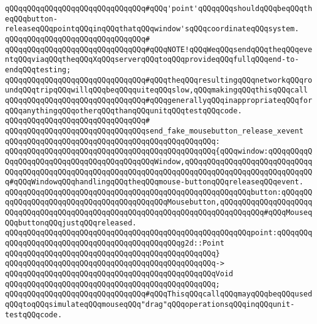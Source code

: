 \verb|qQQqqQQqqQQqqQQqqQQqqQQqqQQqqQQq#qQQq'point'qQQqqQQqshouldqQQqbeqQQqtheqQQqbutton-releaseqQQqpointqQQqinqQQqthatqQQqwindow'sqQQqcoordinateqQQqsystem.|\newline
\verb|qQQqqQQqqQQqqQQqqQQqqQQqqQQqqQQq#|\newline
\verb|qQQqqQQqqQQqqQQqqQQqqQQqqQQqqQQq#qQQqNOTE!qQQqWeqQQqsendqQQqtheqQQqeventqQQqviaqQQqtheqQQqXqQQqserverqQQqtoqQQqprovideqQQqfullqQQqend-to-endqQQqtesting;|\newline
\verb|qQQqqQQqqQQqqQQqqQQqqQQqqQQqqQQq#qQQqtheqQQqresultingqQQqnetworkqQQqroundqQQqtripqQQqwillqQQqbeqQQqquiteqQQqslow,qQQqmakingqQQqthisqQQqcall|\newline
\verb|qQQqqQQqqQQqqQQqqQQqqQQqqQQqqQQq#qQQqgenerallyqQQqinappropriateqQQqforqQQqanythingqQQqotherqQQqthanqQQqunitqQQqtestqQQqcode.|\newline
\verb|qQQqqQQqqQQqqQQqqQQqqQQqqQQqqQQq#|\newline
\verb|qQQqqQQqqQQqqQQqqQQqqQQqqQQqqQQqsend_fake_mousebutton_release_xevent|\newline
\verb|qQQqqQQqqQQqqQQqqQQqqQQqqQQqqQQqqQQqqQQqqQQqqQQq:|\newline
\verb|qQQqqQQqqQQqqQQqqQQqqQQqqQQqqQQqqQQqqQQqqQQqqQQq{qQQqwindow:qQQqqQQqqQQqqQQqqQQqqQQqqQQqqQQqqQQqqQQqqQQqWindow,qQQqqQQqqQQqqQQqqQQqqQQqqQQqqQQqqQQqqQQqqQQqqQQqqQQqqQQqqQQqqQQqqQQqqQQqqQQqqQQqqQQqqQQqqQQqqQQqqQQq#qQQqWindowqQQqhandlingqQQqtheqQQqmouse-buttonqQQqreleaseqQQqevent.|\newline
\verb|qQQqqQQqqQQqqQQqqQQqqQQqqQQqqQQqqQQqqQQqqQQqqQQqqQQqqQQqbutton:qQQqqQQqqQQqqQQqqQQqqQQqqQQqqQQqqQQqqQQqqQQqMousebutton,qQQqqQQqqQQqqQQqqQQqqQQqqQQqqQQqqQQqqQQqqQQqqQQqqQQqqQQqqQQqqQQqqQQqqQQqqQQqqQQq#qQQqMouseqQQqbuttonqQQqjustqQQqreleased.|\newline
\verb|qQQqqQQqqQQqqQQqqQQqqQQqqQQqqQQqqQQqqQQqqQQqqQQqqQQqqQQqpoint:qQQqqQQqqQQqqQQqqQQqqQQqqQQqqQQqqQQqqQQqqQQqqQQqg2d::Point|\newline
\verb|qQQqqQQqqQQqqQQqqQQqqQQqqQQqqQQqqQQqqQQqqQQqqQQq}|\newline
\verb|qQQqqQQqqQQqqQQqqQQqqQQqqQQqqQQqqQQqqQQqqQQqqQQq->|\newline
\verb|qQQqqQQqqQQqqQQqqQQqqQQqqQQqqQQqqQQqqQQqqQQqqQQqVoid|\newline
\verb|qQQqqQQqqQQqqQQqqQQqqQQqqQQqqQQqqQQqqQQqqQQqqQQq;|\newline
\newline
\verb|qQQqqQQqqQQqqQQqqQQqqQQqqQQqqQQq#qQQqThisqQQqcallqQQqmayqQQqbeqQQqusedqQQqtoqQQqsimulateqQQqmouseqQQq"drag"qQQqoperationsqQQqinqQQqunit-testqQQqcode.|\newline
